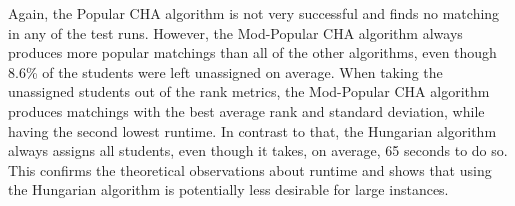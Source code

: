 \begin{table}[h!]
  \centering
  \caption{Average results for large Zipfian dataset (2500 Students) with 10 runs}
  \label{tab:results-zipfian-medium}
\end{table}

Again, the Popular CHA algorithm is not very successful and finds no matching in any of the test runs. However, the Mod-Popular CHA algorithm always produces more popular matchings than all of the other algorithms, even though 8.6\% of the students were left unassigned on average. When taking the unassigned students out of the rank metrics, the Mod-Popular CHA algorithm produces matchings with the best average rank and standard deviation, while having the second lowest runtime. In contrast to that, the Hungarian algorithm always assigns all students, even though it takes, on average, 65 seconds to do so. This confirms the theoretical observations about runtime and shows that using the Hungarian algorithm is potentially less desirable for large instances.

